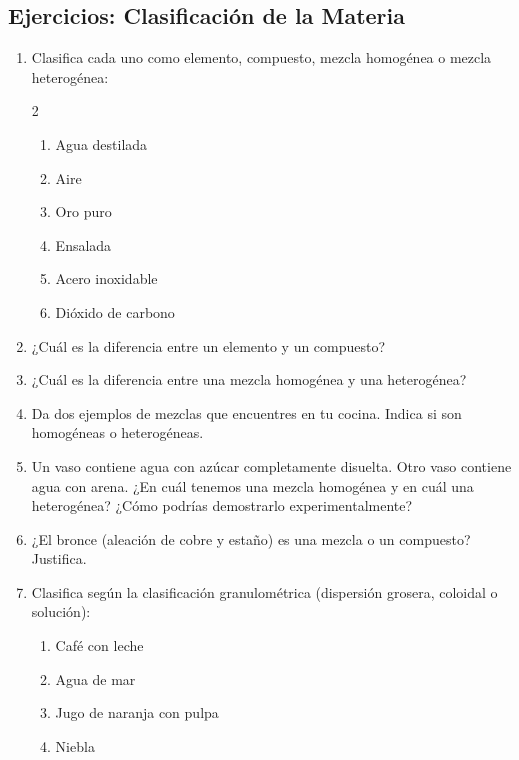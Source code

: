 \documentclass[12pt, a4paper]{article}
\begin{document}

\subsection{Ejercicios: Clasificación de la Materia}

\begin{enumerate}[leftmargin=*, resume]
  \item \facil{} Clasifica cada uno como elemento, compuesto, mezcla homogénea o mezcla heterogénea:
  \begin{multicols}{2}
  \begin{enumerate}[label=\alph*)]
    \item Agua destilada
    \item Aire
    \item Oro puro
    \item Ensalada
    \item Acero inoxidable
    \item Dióxido de carbono
  \end{enumerate}
  \end{multicols}

  \item \facil{} ¿Cuál es la diferencia entre un elemento y un compuesto?

  \item \facil{} ¿Cuál es la diferencia entre una mezcla homogénea y una heterogénea?

  \item \facil{} Da dos ejemplos de mezclas que encuentres en tu cocina. Indica si son homogéneas o heterogéneas.

  \item \medio{} Un vaso contiene agua con azúcar completamente disuelta. Otro vaso contiene agua con arena. ¿En cuál tenemos una mezcla homogénea y en cuál una heterogénea? ¿Cómo podrías demostrarlo experimentalmente?

  \item \medio{} ¿El bronce (aleación de cobre y estaño) es una mezcla o un compuesto? Justifica.

  \item \medio{} Clasifica según la clasificación granulométrica (dispersión grosera, coloidal o solución):
  \begin{enumerate}[label=\alph*)]
    \item Café con leche
    \item Agua de mar
    \item Jugo de naranja con pulpa
    \item Niebla
  \end{enumerate}


\end{enumerate}
\end{document}
